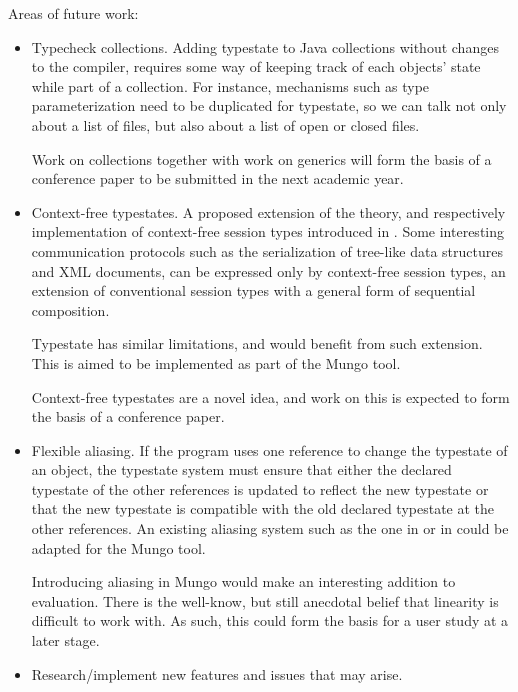Areas of future work:
\begin{itemize}
\item Typecheck collections. Adding typestate to Java collections without changes to the compiler, requires some way of keeping track of each objects' state while part of a collection. For instance, mechanisms such as type parameterization need to be duplicated for typestate, so we can talk not only about a list of files, but also about a list of open or closed files.

Work on collections together with work on generics will form the basis of a conference paper to be submitted in the next academic year.

\item Context-free typestates. A proposed extension of the theory, and respectively implementation of context-free session types introduced in \cite{Thiemann:2016:CST:3022670.2951926, Padovani2017}. Some interesting communication protocols such as  the serialization of tree-like data structures and XML documents\cite{Thiemann:2016:CST:3022670.2951926}, can be expressed only by context-free session types, an extension of conventional session types with a general form of sequential composition.

Typestate has similar limitations, and would benefit from such extension. This is aimed to be implemented as part of the Mungo tool.

Context-free typestates are a novel idea, and work on this is expected to form the basis of a conference paper.

\item Flexible aliasing. If the program uses one reference to change the typestate of an object, the typestate system must ensure that either the declared typestate of the other references is updated to reflect the new typestate or that the new typestate is compatible with the old declared typestate at the other references.
An existing aliasing system such as the one in \cite{BierhoffAldrich:plural} or in \cite{FahndrichM:typo} could be adapted for the Mungo tool.

Introducing aliasing in Mungo would make an interesting addition to evaluation. There is the well-know, but still anecdotal belief that linearity is difficult to work with. As such, this could form the basis for a user study at a later stage.

\item Research/implement new features and issues that may arise.
\end{itemize}

